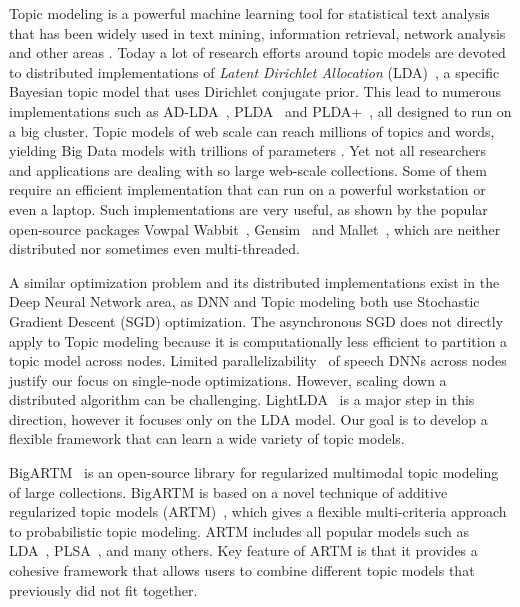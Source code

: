 \documentclass[russian,english]{llncs}
\begin{document}
Topic modeling \cite{blei12ptm} is a powerful machine learning tool for statistical text analysis
that has been widely used in text mining, information retrieval, network analysis and other areas \cite{daud10knowledge}.
Today a lot of research efforts around topic models are devoted to distributed implementations of
\emph{Latent Dirichlet Allocation} (LDA)~\cite{blei03latent},
a specific Bayesian topic model that uses Dirichlet conjugate prior.
This lead to numerous implementations such as
AD-LDA~\cite{newman09distributed}, PLDA~\cite{wang09plda} and PLDA{+}~\cite{liu11plda},
all designed to run on a big cluster.
Topic models of web scale can reach millions of topics and words,
yielding Big Data models with trillions of parameters \cite{yuan15lightlda}.
Yet not all researchers and applications are dealing with so large web-scale collections.
Some of them require an efficient implementation that can run on a powerful workstation or even a laptop.
Such implementations are very useful,
as shown by the popular open-source packages
Vowpal Wabbit~\cite{langford07vw}, Gensim~\cite{rehurek10software} and Mallet~\cite{McCallum02mallet},
which are neither distributed nor sometimes even multi-threaded.

A similar optimization problem and its distributed implementations exist
in the Deep Neural Network area, as
DNN and Topic modeling both use Stochastic Gradient Descent (SGD) optimization.
The asynchronous SGD \cite{dean2012sgd} does not directly apply to Topic modeling because
it is computationally less efficient to partition a topic model across nodes.
Limited parallelizability~\cite{seide2014sgd} of speech DNNs across nodes justify our focus on single-node optimizations.
However, scaling down a distributed algorithm can be challenging.
LightLDA~\cite{yuan15lightlda} is a major step in this direction,
however it focuses only on the LDA model.
Our goal is to develop a flexible framework that can learn a wide variety of topic models.

BigARTM~\cite{vfardi15aist} is an open-source library for
regularized multimodal topic modeling of large collections.
BigARTM is based on a novel technique of additive regularized topic models (ARTM)~\cite{voron14dan-eng,voron14aist,voron15mlj,voron15nonbayesian},
which gives a flexible multi-criteria approach to probabilistic topic modeling.
ARTM includes all popular models such as 
LDA~\cite{blei03latent}, 
PLSA~\cite{hofmann99plsi},
and many others.
Key feature of ARTM is that it provides a cohesive framework that allows users to combine
different topic models that previously did not fit together.
\end{document}
